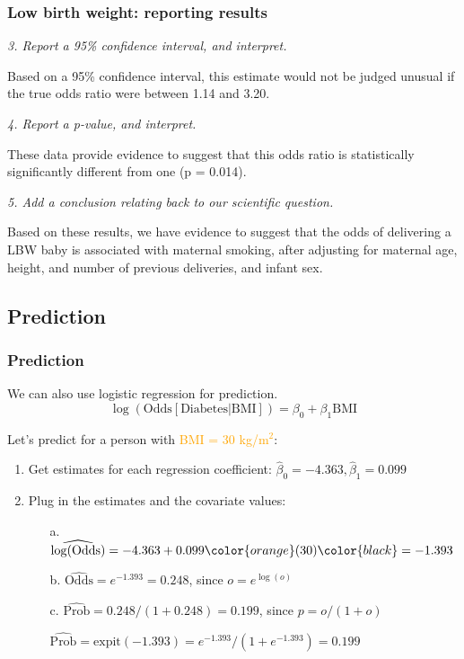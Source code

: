 \documentclass[12pt, 
hyperref={colorlinks=true, linkcolor=blue, urlcolor=cyan}]{beamer}
\begin{document}
\begin{frame}
\frametitle{Low birth weight: reporting results}
\textit{3. Report a 95\% confidence interval, and interpret.}

Based on a 95\% confidence interval, this estimate would not be judged unusual if the true odds ratio were between 1.14 and 3.20. \pause

\textit{4. Report a p-value, and interpret.}

These data provide evidence to suggest that this odds ratio is statistically significantly different from one (p = 0.014). \pause

\textit{5. Add a conclusion relating back to our scientific question.}

Based on these results, we have evidence to suggest that the odds of delivering a LBW baby is associated with maternal smoking, after adjusting for maternal age, height, and number of previous deliveries, and infant sex.

\end{frame}


\subsection{Prediction}
\begin{frame}
\frametitle{Prediction}
We can also use logistic regression for prediction. $$\log\left(\text{Odds}[\text{Diabetes}| \text{BMI}]\right) = \beta_0 + \beta_1 \text{BMI}$$

Let's predict for a person with \textcolor{orange}{BMI = 30 kg/m$^2$}:

\begin{enumerate}
\item Get estimates for each regression coefficient: $\hat\beta_0 = -4.363, \hat\beta_1 = 0.099$
\item Plug in the estimates and the covariate values: \pause
	\begin{itemize}
	\item[a.] $\widehat{\log(\text{Odds})} = -4.363 +  0.099\color{orange}(30)\color{black} = -1.393$ \pause
	\item[b.] $\widehat{\text{Odds}} = e^{-1.393} = 0.248$, \color{blue} since $o = e^{\log(o)}$ \color{black} \pause
	\item[c.] $\widehat{\text{Prob}} = 0.248/(1+0.248) = 0.199$, \color{blue} since $p = o/(1+o)$ \color{black} \pause
	\item[] $\widehat{\text{Prob}} = \text{expit}(-1.393) = e^{-1.393}/(1+e^{-1.393})= 0.199$
	\end{itemize}
\end{enumerate}
\end{frame}
\end{document}
